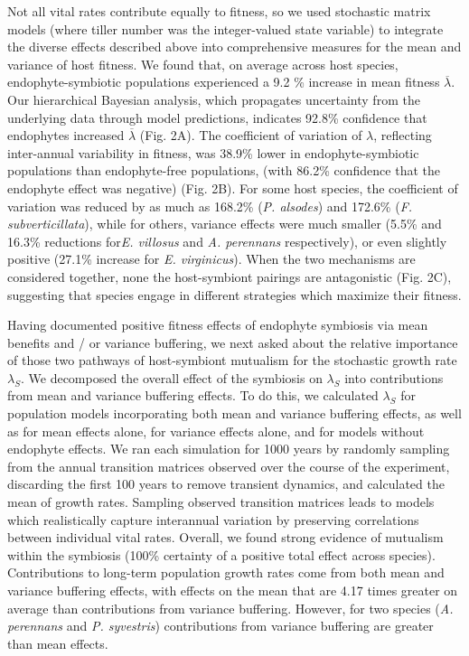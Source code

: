 \documentclass[12pt]{article}
\begin{document}
Not all vital rates contribute equally to fitness, so we used stochastic matrix models (where tiller number was the integer-valued state variable) to integrate the diverse effects described above into comprehensive measures for the mean and variance of host fitness.
We found that, on average across host species, endophyte-symbiotic populations experienced a 9.2 \% increase in mean fitness $\overline{\lambda}$. 
Our hierarchical Bayesian analysis, which propagates uncertainty from the underlying data through model predictions, indicates 92.8\% confidence that endophytes increased $\overline{\lambda}$ (Fig. 2A).
The coefficient of variation of $\lambda$, reflecting inter-annual variability in fitness, was 38.9\% lower in endophyte-symbiotic populations than endophyte-free populations, (with 86.2\% confidence that the endophyte effect was negative) (Fig. 2B).
For some host species, the coefficient of variation was  reduced by as much as 168.2\% (\emph{P. alsodes}) and 172.6\% (\emph{F. subverticillata}), while for others, variance effects were much smaller (5.5\% and 16.3\% reductions for\emph{E. villosus} and \emph{A. perennans} respectively), or even slightly positive  (27.1\% increase for \emph{E. virginicus}).
When the two mechanisms are considered together, none the host-symbiont pairings are antagonistic (Fig. 2C), suggesting that species engage in different strategies which maximize their fitness. 

Having documented positive fitness effects of endophyte symbiosis via mean benefits and / or variance buffering, we next asked about the relative importance of those two pathways of host-symbiont mutualism for the stochastic growth rate $\lambda_{S}$.
We decomposed the overall effect of the symbiosis on $\lambda_{S}$ into contributions from mean and variance buffering effects.
To do this, we calculated $\lambda_{S}$ for population models incorporating both mean and variance buffering effects, as well as for mean effects alone, for variance effects alone, and for models without endophyte effects. 
We ran each simulation for 1000 years by randomly sampling from the annual transition matrices observed over the course of the experiment, discarding the first 100 years to remove transient dynamics, and calculated the mean of growth rates.  
Sampling observed transition matrices leads to models which realistically capture interannual variation by preserving correlations between individual vital rates.
Overall, we found strong evidence of mutualism within the symbiosis (100\% certainty of a positive total effect across species).
Contributions to long-term population growth rates come from both mean and variance buffering effects, with effects on the mean that are 4.17 times greater on average than contributions from variance buffering. 
However, for two species (\emph{A. perennans} and \emph{P. syvestris}) contributions from variance buffering are greater than mean effects. 
\end{document}
